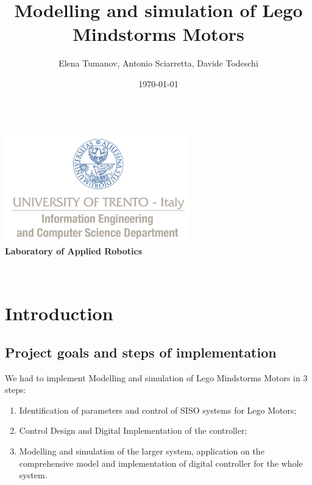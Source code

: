 \documentclass[a4paper,12pt,oneside]{article}
\title{Modelling and simulation of Lego Mindstorms Motors}
\author{Elena Tumanov, Antonio Sciarretta, Davide Todeschi}
\date{\today}
\begin{document}
\makeatletter  %
\begin{titlepage}
      \centering
      ~~~~~~~~~~~~~\\[-10mm]
      \includegraphics[keepaspectratio=true, width=8cm]{logounitn.jpg} \\[11mm]

     {
     \large \bfseries Laboratory of Applied Robotics\\[3mm]
     }


     \vspace{0.5cm}
     {
     \Large \bfseries \textcolor{black}{\@title} \par
     }
     \vspace{1 cm}
     \vspace{1 cm}

     {\large {\@author}}
     \\ \vspace{1 cm}
     \@date

\end{titlepage}


\section{Introduction}


\subsection{Project goals and steps of implementation} 
We had to implement Modelling and simulation of Lego Mindstorms Motors in 3 steps:
\begin{enumerate}
\item Identification of parameters and control of SISO systems for Lego Motors;
\item Control Design and Digital Implementation of the controller;
\item Modelling and simulation of the larger system, application on the comprehensive model and implementation of digital controller for the whole system.
\end{enumerate}
\end{document}
